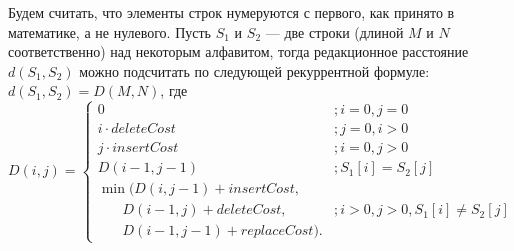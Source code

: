 \begin{lemma}
    Будем считать, что элементы строк нумеруются с первого, как принято в математике, а не нулевого.
    Пусть $S_1$ и $S_2$ --- две строки (длиной $M$ и $N$ соответственно) над некоторым алфавитом, тогда редакционное расстояние $d(S_1,S_2)$ можно подсчитать по следующей рекуррентной формуле: $d(S_1,S_2) = D(M, N)$, где
    \begin{equation*}
        D(i, j) = 
        \begin{cases}
            0 &;i = 0, j = 0\\
            i \cdot deleteCost &;j = 0, i > 0\\
            j \cdot insertCost &;i = 0, j > 0\\
            D(i-1,j-1) &;S_1[i] = S_2[j]\\
            \min(D(i, j - 1) + insertCost,\\
            \ \ \ \ \ \ \ \ D(i - 1, j) + deleteCost, &;i > 0, j > 0, S_1[i] \not= S_2[j]\\
            \ \ \ \ \ \ \ \ D(i - 1, j - 1) + replaceCost).
        \end{cases}
    \end{equation*}
\end{lemma}

